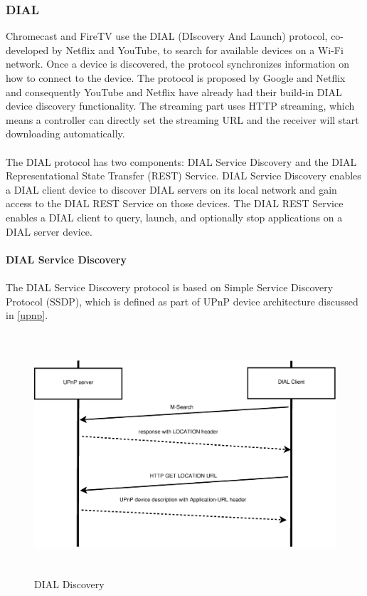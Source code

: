 \subsubsection{DIAL} 
Chromecast and FireTV use the DIAL \cite{dial} (DIscovery And Launch) protocol,
co-developed by Netflix and YouTube, to search for available devices on a Wi-Fi network. 
Once a device is discovered, the protocol synchronizes information on how to 
connect to the device. The protocol is proposed by Google and Netflix and consequently 
YouTube and Netflix  have already had their build-in DIAL device discovery functionality. The 
streaming part uses HTTP streaming, which means a controller can directly set the 
streaming URL and the receiver will start downloading automatically. \\
\\
The DIAL protocol has two components: DIAL Service Discovery and the DIAL 
Representational State Transfer (REST) Service. DIAL Service Discovery enables a 
DIAL client device to discover DIAL servers on its local network and gain
access to the DIAL REST Service on those devices. The DIAL REST Service enables
a DIAL client to query, launch, and optionally stop applications on a DIAL
server device.\\
\\
\textbf{DIAL Service Discovery} \\
\\ 
The DIAL Service Discovery protocol is based on Simple Service Discovery 
Protocol (SSDP), which is defined as part of UPnP device architecture discussed 
in \ref{upnp}. \\
\begin{figure}[htb] \centering 
\includegraphics[height=9cm]{charts/dial_discovery} 
\caption{DIAL Discovery \label{dial_discovery}} 
\end{figure} 
